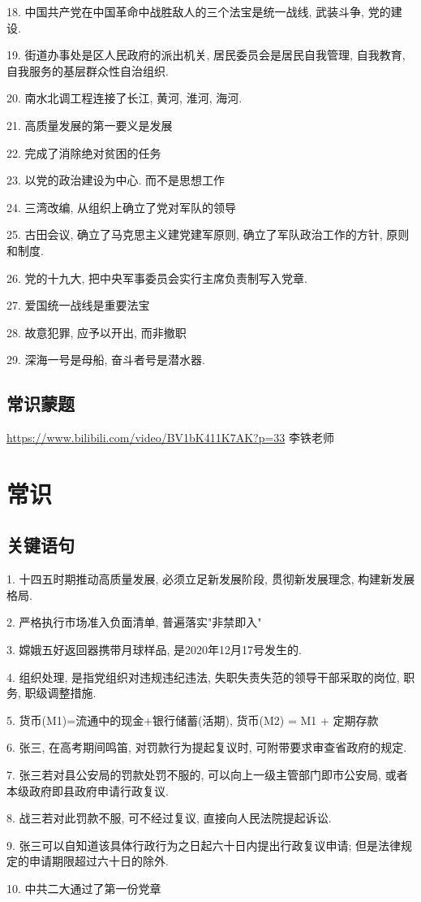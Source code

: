 18.  中国共产党在中国革命中战胜敌人的三个法宝是统一战线, 武装斗争, 党的建设.

19. 街道办事处是区人民政府的派出机关, 居民委员会是居民自我管理, 自我教育, 自我服务的基层群众性自治组织.

20. 南水北调工程连接了长江, 黄河, 淮河, 海河.

21. 高质量发展的第一要义是发展

22. 完成了消除绝对贫困的任务

23. 以党的政治建设为中心. 而不是思想工作

24. 三湾改编, 从组织上确立了党对军队的领导

25. 古田会议, 确立了马克思主义建党建军原则, 确立了军队政治工作的方针, 原则和制度.

26. 党的十九大, 把中央军事委员会实行主席负责制写入党章.

27. 爱国统一战线是重要法宝

28. 故意犯罪, 应予以开出, 而非撤职

29. 深海一号是母船, 奋斗者号是潜水器.



\subsection{常识蒙题}
\url{https://www.bilibili.com/video/BV1bK411K7AK?p=33}  李铁老师


\section{常识}

\subsection{关键语句}

1. 十四五时期推动高质量发展, 必须立足新发展阶段, 贯彻新发展理念, 构建新发展格局.

2. 严格执行市场准入负面清单, 普遍落实"非禁即入"

3. 嫦娥五好返回器携带月球样品, 是2020年12月17号发生的.

4. 组织处理, 是指党组织对违规违纪违法, 失职失责失范的领导干部采取的岗位, 职务, 职级调整措施.

5. 货币(M1)=流通中的现金+银行储蓄(活期), 货币(M2) = M1 + 定期存款

6. 张三, 在高考期间鸣笛, 对罚款行为提起复议时, 可附带要求审查省政府的规定.

7. 张三若对县公安局的罚款处罚不服的, 可以向上一级主管部门即市公安局, 或者本级政府即县政府申请行政复议.

8. 战三若对此罚款不服, 可不经过复议, 直接向人民法院提起诉讼.

9. 张三可以自知道该具体行政行为之日起六十日内提出行政复议申请; 但是法律规定的申请期限超过六十日的除外.

10. 中共二大通过了第一份党章
